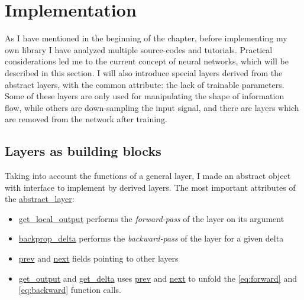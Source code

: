 

\section{Implementation}
As I have mentioned in the beginning of the chapter, before implementing my own library I have analyzed multiple source-codes and tutorials. 
Practical considerations led me to the current concept of neural networks, which will be described in this section.
I will also introduce special layers derived from the abstract layers, 
with the common attribute: the lack of trainable parameters. 
Some of these layers are only used for manipulating the shape of information flow, 
while others are down-sampling the input signal, 
and there are layers which are removed from the network after training.


\subsection{Layers as building blocks}
Taking into account the functions of a general layer, 
I made an abstract object with interface to implement
by derived layers. 
The most important attributes of the \url{abstract_layer}:
\begin{itemize}
\item[] \url{get_local_output} performs the \emph{forward-pass} of the layer on its argument
\item[] \url{backprop_delta} performs the \emph{backward-pass} of the layer for a given delta
\item[] \url{prev} and \url{next} fields pointing to other layers
\item[] \url{get_output} and \url{get_delta} uses \url{prev} and \url{next} to unfold the \ref{eq:forward} and \ref{eq:backward} function calls.
\end{itemize}


